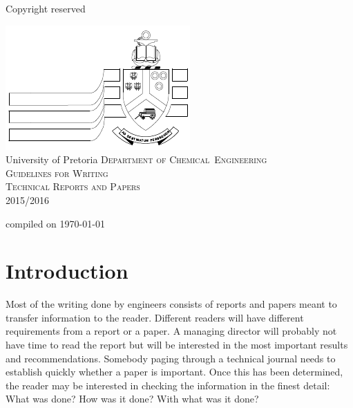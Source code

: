 \documentclass[a5paper, 10pt]{article}
\begin{document}
\begin{titlepage}
  \begin{centering}
    \begin{flushright}Copyright reserved\end{flushright}
    \vfil
    \includegraphics{uplogo}\\
    \textsf{University of Pretoria}
    \vfil
    {\Huge\scshape
    Department of Chemical~Engineering\\
    \vfil
    Guidelines for Writing \\ Technical Reports and Papers\\}
  \vfil
  2015/2016 \\
  \vfil
  \begin{flushright}\small{compiled on \today}\end{flushright}
\end{centering}

\end{titlepage}

\pagestyle{empty}

\cleardoublepage

\setcounter{page}{1}
\pagestyle{plain}
\tableofcontents
\newpage

\pagestyle{empty}
\cleardoublepage
\setcounter{page}{1}
\pagestyle{plain}

\section{Introduction}
\label{cha:introduction}
Most of the writing done by engineers consists of reports and papers
meant to transfer information to the reader.  Different readers will
have different requirements from a report or a paper.  A managing
director will probably not have time to read the report but will be
interested in the most important results and recommendations.
Somebody paging through a technical journal needs to establish quickly
whether a paper is important.  Once this has been determined, the
reader may be interested in checking the information in the finest
detail: 
What was done?  
How was it done?  
With what was it done?
\end{document}

